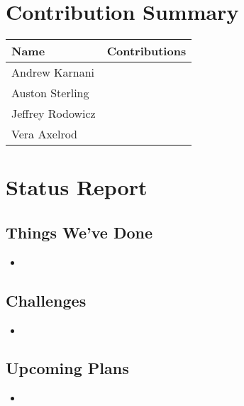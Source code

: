 \documentclass[11pt]{article}
\newenvironment{packed_itemize}{
\begin{itemize}
  \setlength{\itemsep}{1pt}
  \setlength{\parskip}{0pt}
  \setlength{\parsep}{0pt}
}{\end{itemize}}
\begin{document}
\section{Contribution Summary}

\begin{tabular}{|m{1.4in}|m{4in}|}
\hline
\textbf{\large Name}     & \textbf{\large Contributions} \\
\hline\hline
 Andrew Karnani
	&
	 \begin{packed_itemize}
		\item 
	\end{packed_itemize}
\\
\hline
 Auston Sterling
	&
	 \begin{packed_itemize}
	        \item 
	\end{packed_itemize}
\\
\hline
Jeffrey Rodowicz
	&
	 \begin{packed_itemize}
		\item 
	\end{packed_itemize}
\\
\hline
Vera Axelrod
	&
	 \begin{packed_itemize}
		\item 
	\end{packed_itemize}
\\
\hline
\end{tabular}

\section{Status Report}

\subsection{Things We've Done}
\begin{itemize}
\item
\end{itemize}

\subsection{Challenges}
\begin{itemize}
\item
\end{itemize}

\subsection{Upcoming Plans}
\begin{itemize}
\item
\end{itemize}
\end{document}
